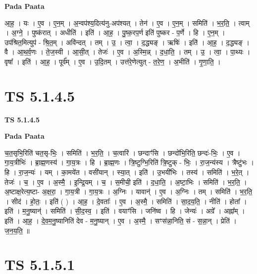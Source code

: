 \documentclass[17pt]{extarticle}
\begin{document}
\textbf{Pada Paata} \newline

आ॒ह॒ । यः । ए॒व । ए॒न॒म् । अ॒न्वप॑श्य॒दित्य॑नु-अप॑श्यत् । तेन॑ । ए॒व । ए॒न॒म् । समिति॑ । भ॒र॒ति॒ । त्वाम् । अ॒ग्ने॒ । पुष्क॑रात् । अधीति॑ । इति॑ । आ॒ह॒ । पु॒ष्क॒रप॒र्ण इति॑ पुष्कर - प॒र्णे । हि । ए॒न॒म् । उप॑श्रित॒मित्युप॑ - श्रि॒त॒म् । अवि॑न्दत् । तम् । उ॒ । त्वा॒ । द॒द्ध्यङ् । ऋषिः॑ । इति॑ । आ॒ह॒ । द॒द्ध्यङ् । वै । आ॒थ॒र्व॒णः । ते॒ज॒स्वी । आ॒सी॒त् । तेजः॑ । ए॒व । अ॒स्मि॒न्न् । द॒धा॒ति॒ । तम् । उ॒ । त्वा॒ । पा॒थ्यः । वृषा᳚ । इति॑ । आ॒ह॒ । पूर्व᳚म् । ए॒व । उ॒दि॒तम् । उत्त॑रे॒णेत्युत् - त॒रे॒ण॒ । अ॒भीति॑ । गृ॒णा॒ति॒ ।  \newline




\section*{ TS 5.1.4.5 }

\textbf{TS 5.1.4.5 } \newline

\textbf{Pada Paata} \newline

च॒त॒सृभि॒रिति॑ चत॒सृ-भिः॒ । समिति॑ । भ॒र॒ति॒ । च॒त्वारि॑ । छन्दाꣳ॑सि । छन्दो॑भि॒रिति॒ छन्दः॑-भिः॒ । ए॒व । गा॒य॒त्रीभिः॑ । ब्रा॒ह्म॒णस्य॑ । गा॒य॒त्रः । हि । ब्रा॒ह्म॒णः । त्रि॒ष्टुग्भि॒रिति॑ त्रि॒ष्टुक् - भिः॒ । रा॒ज॒न्य॑स्य । त्रैष्टु॑भः । हि । रा॒ज॒न्यः॑ । यम् । का॒मये॑त । वसी॑यान् । स्या॒त् । इति॑ । उ॒भयी॑भिः । तस्य॑ । समिति॑ । भ॒रे॒त् । तेजः॑ । च॒ । ए॒व । अ॒स्मै॒ । इ॒न्द्रि॒यम् । च॒ । स॒मीची॒ इति॑ । द॒धा॒ति॒ । अ॒ष्टा॒भिः । समिति॑ । भ॒र॒ति॒ । अ॒ष्टाक्ष॒रेत्य॒ष्टा- अ॒क्ष॒रा॒ । गा॒य॒त्री । गा॒य॒त्रः । अ॒ग्निः । यावान्॑ । ए॒व । अ॒ग्निः । तम् । समिति॑ । भ॒र॒ति॒ । सीद॑ । हो॒तः॒ । इति॑ ( ) । आ॒ह॒ । दे॒वताः᳚ । ए॒व । अ॒स्मै॒ । समिति॑ । सा॒द॒य॒ति॒ । नीति॑ । होता᳚ । इति॑ । म॒नु॒ष्यान्॑ । समिति॑ । सी॒द॒स्व॒ । इति॑ । वयाꣳ॑सि । जनि॑ष्व । हि । जेन्यः॑ । अग्रे᳚ । अह्ना᳚म् । इति॑ । आ॒ह॒ । दे॒व॒म॒नु॒ष्यानिति॑ देव - म॒नु॒ष्यान् । ए॒व । अ॒स्मै॒ । सꣳस॑न्ना॒निति॒ सं - स॒न्ना॒न् । प्रेति॑ । ज॒न॒य॒ति॒ ॥  \newline




\section*{ TS 5.1.5.1 }
\end{document}
